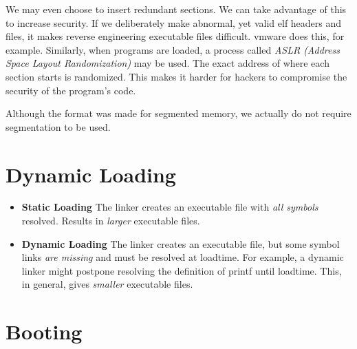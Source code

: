 We may even choose to insert redundant sections. 
We can take advantage of this to increase security. 
If we deliberately make abnormal, yet valid elf headers and files, 
it makes reverse engineering executable files difficult. vmware 
does this, for example. Similarly, when programs are loaded, a process called 
\textit{ASLR (Address Space Layout Randomization)} may be used. 
The exact address of where each section starts is randomized. 
This makes it harder for hackers to compromise the security of the program’s code. 


Although the format was made for segmented memory, 
we actually do not require segmentation to be used. 


\section{Dynamic Loading}

\begin{itemize}   
\renewcommand{\labelitemi}{$\Box$}
\item \textbf{Static Loading} The linker creates an executable file with 
\textit{all symbols} resolved. Results in \textit{larger} executable ﬁles. 
\item \textbf{Dynamic Loading} The linker creates an executable file, but some
symbol links \textit{are missing} and must be resolved at loadtime. 
For example, a dynamic linker might postpone resolving the definition of printf until loadtime.
This, in general, gives \textit{smaller} executable ﬁles. 
\end{itemize}

\section{Booting}


